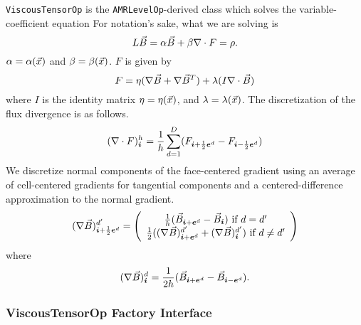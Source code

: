 {\tt ViscousTensorOp} is the {\tt AMRLevelOp}-derived class which solves
the variable-coefficient equation
For notation's sake, what we are solving is
$$
L \vec B = \alpha \vec B + \beta \nabla \cdot F = \rho.
$$
$\alpha = \alpha(\vec x)$ and $\beta = \beta(\vec x)$. $F$ is given by 
$$
F = \eta(\nabla \vec B + \nabla \vec B^T) +  \lambda (I \nabla \cdot \vec B)
$$
where $I$ is the identity matrix $\eta = \eta(\vec x)$, and $\lambda = \lambda(\vec x)$.
The discretization of the flux divergence is as follows.
$$
(\nabla \cdot F)^h_{\boldsymbol{i}} = \frac{1}{h}\sum\limits^D_{d=1} 
(F_{{\boldsymbol{i}}+\frac{1}{2} {\boldsymbol{e}}^d} - F_{{\boldsymbol{i}}-\frac{1}{2} {\boldsymbol{e}}^d})
$$
We discretize normal components of the face-centered gradient  using 
an average of cell-centered gradients for tangential components and a
centered-difference approximation to the normal gradient.
$$
(\nabla \vec B)^{d'}_{{\boldsymbol{i}} + \frac{1}{2} {\boldsymbol{e}}^d} = \left( \begin{array}{c}
                      \frac{1}{h}(\vec B_{{\boldsymbol{i}}+ {\boldsymbol{e}}^d}  -\vec B_{{\boldsymbol{i}}})  \mbox{ if } d = d'\\
                      \frac{1}{2}((\nabla \vec B)^{d'}_{{\boldsymbol{i}}+{\boldsymbol{e}}^d}  +
                      (\nabla \vec B)^{d'}_{{\boldsymbol{i}}})  \mbox{ if } d \neq d'
                      \end{array}
                      \right)
$$
where 
$$
(\nabla \vec B)^{d}_{{\boldsymbol{i}}} = \frac{1}{2 h}(\vec B_{{\boldsymbol{i}} + {\boldsymbol{e}}^d} - \vec B_{{\boldsymbol{i}} - {\boldsymbol{e}}^d}).
$$

\subsubsection{ViscousTensorOp Factory Interface}


